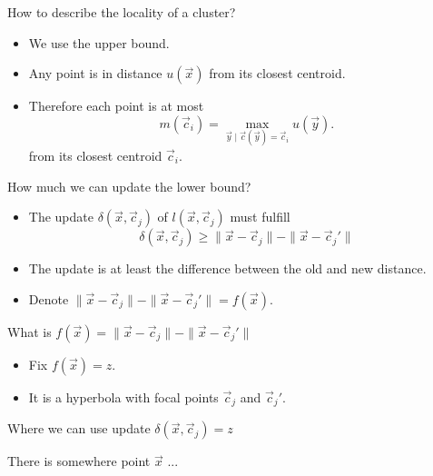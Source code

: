\documentclass[10pt, compress]{beamer}
\newcommand{\x}{\vec{x}}
\newcommand{\cj}{\vec{c}_j}
\newcommand{\ci}{\vec{c}_i}
\newcommand{\ux}{u(\x)}
\newcommand{\lxcj}{l(\x, \cj)}
\newcommand{\distxcj}{\| \x - \cj \|}
\newcommand{\distxcjp}{\| \x - \cj' \|}
\newcommand{\deltaxcj}{\delta(\x, \cj)}
\newcommand{\mci}{m(\ci)}
\begin{document}
\begin{frame}{How to describe the locality of a cluster?}
  \begin{itemize}
    \item We use the upper bound.
    \item Any point is in distance $\ux$ from its closest centroid.
    \item Therefore each point is at most
      \begin{equation*}
         \mci = \max_{\vec{y} \mid \vec{c}(\vec{y}) = \ci} u(\vec{y}).
      \end{equation*}
      from its closest centroid $\ci$.
  \end{itemize}
\end{frame}

\begin{frame}{How much we can update the lower bound?}
  \begin{itemize}
     \item The update $\deltaxcj$ of $\lxcj$ must fulfill
       \begin{equation*}
         \deltaxcj \geq \distxcj - \distxcjp
       \end{equation*}
     \item The update is at least the difference between the old and new distance.
     \item Denote $\distxcj - \distxcjp = f(\x)$.
  \end{itemize}
\end{frame}

\begin{frame}{What is $f(\x) = \distxcj - \distxcjp$}
  \begin{itemize}
    \item Fix $f(\x) = z$.
    \item It is a hyperbola with focal points $\cj$ and $\cj'$.
  \end{itemize}
  \begin{center}
    
  \end{center}
\end{frame}

\begin{frame}{Where we can use update $\deltaxcj = z$}
  \begin{center}
    
  \end{center}
\end{frame}

\begin{frame}{There is somewhere point $\x$ ...}
  \begin{center}
    
  \end{center}
\end{frame}
\end{document}
